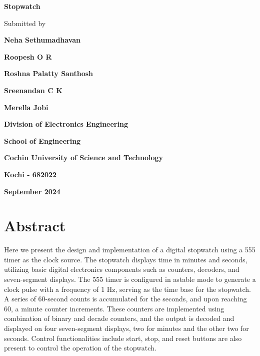 \documentclass[12pt, a4paper]{article}
\newcommand{\usection}[1]{
	\section*{\center \Huge #1}
	\addcontentsline{toc}{section}{\protect\numberline{}#1}
}
\begin{document}
\begin{titlepage}
	\centering

	{\huge \textbf{Stopwatch} \par}

	\vspace{1.3cm}

	{\large Submitted by \par}

	\vspace{.5cm}

	{\large \textbf{Neha Sethumadhavan}\par}
	{\large \textbf{Roopesh O R}\par}
	{\large \textbf{Roshna Palatty Santhosh}\par}
	{\large \textbf{Sreenandan C K}\par}
	{\large \textbf{Merella Jobi}\par}

	\vspace{2.5cm}

 	\par

	\vspace{.1cm}

	{\textbf{Division of Electronics Engineering} \par}
	{\textbf{School of Engineering} \par}
	{\textbf{Cochin University of Science and Technology} \par}
	{\textbf{Kochi - 682022} \par}

	\vspace{.5cm}

	{\textbf{September 2024} \par}

	\vfill

\end{titlepage}
\setlength{\parskip}{5pt}%

\vspace*{4cm}
\thispagestyle{empty}
\addtocounter{page}{-1}
\usection{Abstract}
\vspace{.5cm}
Here we present the design and implementation of a digital stopwatch using a 555 timer as the clock source. The stopwatch displays time in minutes and seconds, utilizing basic digital electronics components such as counters, decoders, and seven-segment displays. The 555 timer is configured in astable mode to generate a clock pulse with a frequency of 1 Hz, serving as the time base for the stopwatch. A series of 60-second counts is accumulated for the seconds, and upon reaching 60, a minute counter increments. These counters are implemented using combination of binary and decade counters, and the output is decoded and displayed on four seven-segment displays, two for minutes and the other two for seconds.
Control functionalities include start, stop, and reset buttons are also present to control the operation of the stopwatch.
\end{document}
